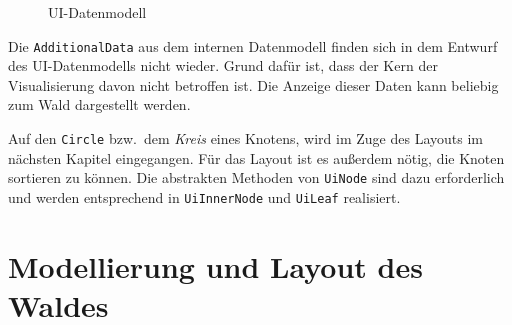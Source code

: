 \begin{figure}[htb]
\caption{UI-Datenmodell}
\label{fig:ui-model}
\end{figure}

Die \texttt{AdditionalData} aus dem internen Datenmodell finden sich in dem Entwurf des UI-Datenmodells nicht wieder. Grund dafür ist, dass der Kern der Visualisierung davon nicht betroffen ist. Die Anzeige dieser Daten kann beliebig zum Wald dargestellt werden.

Auf den \texttt{Circle} bzw.\ dem \textit{Kreis} eines Knotens, wird im Zuge des Layouts im nächsten Kapitel eingegangen. Für das Layout ist es außerdem nötig, die Knoten sortieren zu können. Die abstrakten Methoden von \texttt{UiNode} sind dazu erforderlich und werden entsprechend in \texttt{UiInnerNode} und \texttt{UiLeaf} realisiert.

\chapter{Modellierung und Layout des Waldes}
\label{ch:layout}

